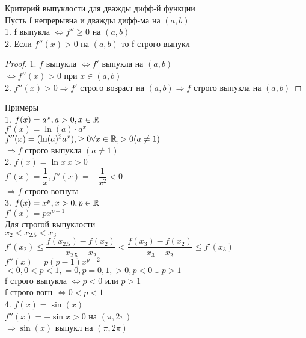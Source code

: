 \begin{theorem}
	Критерий выпуклости для дважды дифф-й функции \\
	Пусть f непрерывна и дважды дифф-ма на $ (a, b)$ \\
	1. f выпукла $ \Leftrightarrow  f'' \geq 0$ на $ (a, b) $ \\
	2. Если $ f''(x) > 0 $ на $ (a, b) $ то f строго выпукл \\
	\begin{proof}
		1. $ f $ выпукла $ \Leftrightarrow  f' $ выпукла на $  (a,b) $ \\ 
		$ \Leftrightarrow f''(x) > 0 $ при $ x \in (a, b) $ \\
		2. $ f''(x) > 0 \Rightarrow f' $ строго возраст на $ (a, b) \Rightarrow f $ строго выпукла на $ (a, b) $ 
	\end{proof}
\end{theorem}
Примеры \\
1. $ f(x) = a^x, a > 0, x\in \mathbb{R} $ \\
$ f'(x) = \ln(a) \cdot a^x $ \\
$ f''(x) = (\ln(a)^2 a^x), \geq 0 \forall x \in \mathbb{R}, > 0 (a \neq 1) $ \\
$ \Rightarrow f $ строго выпукла $ (a \neq 1) $ \\
2. $ f(x) = \ln x \ x > 0  $ \\
$ f'(x) = \dfrac{1}{x} , f''(x) = -\dfrac{1}{x^2} < 0 $ \\
$ \Rightarrow f $ строго вогнута \\
3. $ f(x) = x^p, x>0, p \in \mathbb{R} $ \\
$ f'(x) = px^{p-1} $ \\	Для строгой выпуклости \\
$ x_2 < x_{2.5} < x_3 $ \\
$ f'(x_2) \leq  \dfrac{f(x_{2.5}) - f(x_2)}{x_{2.5} - x_2} <  \dfrac{f(x_3) - f(x_2)}{x_3 - x_2} \leq f'(x_3) $
$ f''(x) = p(p-1)x^{p-2} $ \\
$ < 0, 0 < p < 1, =0, p = 0,1, >0, p < 0 \cup p > 1 $ \\
f строго выпукла $ \Leftrightarrow p< 0 $ или $ p > 1 $ \\
f строго вогн $ \Leftrightarrow 0 < p < 1 $ \\
4. $f(x) = \sin(x) $ \\
$ f''(x) = -\sin x > 0 $ на $ (\pi, 2\pi) $ \\
$ \Rightarrow \sin(x) $ выпукл на $ (\pi,2\pi) $ \\ 

